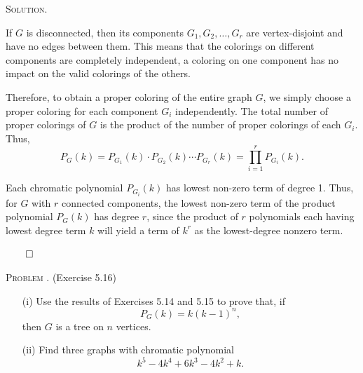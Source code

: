 \documentclass[12pt, a4paper, oneside]{ctexart}
\newcounter{problemname}
\newenvironment{problem}{\begin{framed}\stepcounter{problemname}\par\noindent\textsc{Problem \arabic{problemname}. }}{\end{framed}\par}
\newenvironment{solution}{%
	\par\noindent\textsc{Solution. }\ignorespaces
}{%
	\hfill$\qed$\par
}
\begin{document}
	\begin{solution}

        If $G$ is disconnected, then its components $G_1, G_2, \dots, G_r$ are vertex-disjoint and have no edges 
        between them. This means that the colorings on different components are completely independent, 
        a coloring on one component has no impact on the valid colorings of the others.

        Therefore, to obtain a proper coloring of the entire graph $G$, we simply choose a proper coloring 
        for each component $G_i$ independently. The total number of proper colorings of $G$ is the product 
        of the number of proper colorings of each $G_i$. Thus,
        \[
        P_G(k) = P_{G_1}(k) \cdot P_{G_2}(k) \cdots P_{G_r}(k) = \prod_{i=1}^r P_{G_i}(k).
        \]
        
        Each chromatic polynomial $P_{G_i}(k)$ has lowest non-zero term of degree 1.
        Thus, for $G$ with $r$ connected components, the lowest non-zero term of the product polynomial $P_G(k)$
        has degree $r$, since the product of $r$ polynomials each having lowest degree term $k$ 
        will yield a term of $k^r$ as the lowest-degree nonzero term.
        

		
	\end{solution}
     

    \begin{problem}
        (Exercise 5.16)

        \begin{enumerate}
            \item[(i)] Use the results of Exercises 5.14 and 5.15 to prove that, if
            \[
            P_G(k) = k(k - 1)^n,
            \]
            then $G$ is a tree on $n$ vertices.
            
            \item[(ii)] Find three graphs with chromatic polynomial
            \[
            k^5 - 4k^4 + 6k^3 - 4k^2 + k.
            \]
          \end{enumerate}          
		
    \end{problem}
	
\end{document}
